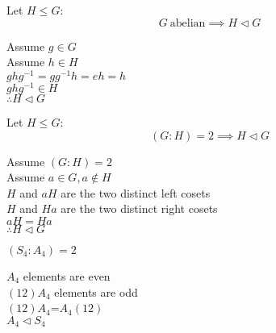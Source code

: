 \documentclass[letterpaper,12pt,fleqn]{article}
\newcommand{\n}{\mathrel{\triangleleft}}
\begin{document}
\begin{corollary}
  Let $H\le G$:
  \[G\ \mbox{abelian}\implies H\n G\]
\end{corollary}

\begin{theproof}
  Assume $g\in G$ \\
  Assume $h\in H$ \\
  $ghg^{-1}=gg^{-1}h=eh=h$ \\
  $ghg^{-1}\in H$ \\
  $\therefore H\n G$
\end{theproof}

\begin{theorem}
  Let $H\le G$:
  \[(G:H)=2\implies H\n G\]
\end{theorem}

\begin{theproof}
  \begin{minipage}{3.5in}
    Assume $(G:H)=2$ \\
    Assume $a\in G,a\notin H$ \\
    $H$ and $aH$ are the two distinct left cosets \\
    $H$ and $Ha$ are the two distinct right cosets \\
    $aH=Ha$ \\
    $\therefore H\n G$
  \end{minipage}
  \begin{minipage}{3in}
  \end{minipage}
\end{theproof}

\begin{example}
  $(S_4:A_4)=2$

  $A_4$ elements are even \\
  $(12)A_4$ elements are odd \\
  $(12)A_4$=$A_4(12)$ \\
  $A_4\n S_4$
\end{example}
\end{document}
